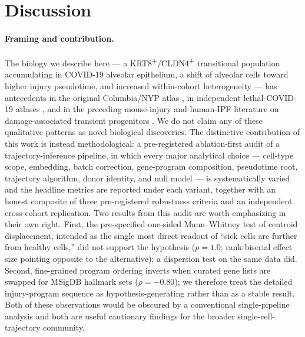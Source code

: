 \documentclass[11pt]{article}
\begin{document}
\section{Discussion}

\paragraph{Framing and contribution.} The biology we describe here --- a KRT8\textsuperscript{+}/CLDN4\textsuperscript{+} transitional population accumulating in COVID-19 alveolar epithelium, a shift of alveolar cells toward higher injury pseudotime, and increased within-cohort heterogeneity --- has antecedents in the original Columbia/NYP atlas \citep{Melms2021}, in independent lethal-COVID-19 atlases \citep{Delorey2021, Bharat2020, Wendisch2021}, and in the preceding mouse-injury and human-IPF literature on damage-associated transient progenitors \citep{Kobayashi2020, Strunz2020, Adams2020, Habermann2020}. We do not claim any of these qualitative patterns as novel biological discoveries. The distinctive contribution of this work is instead methodological: a pre-registered ablation-first audit of a trajectory-inference pipeline, in which every major analytical choice --- cell-type scope, embedding, batch correction, gene-program composition, pseudotime root, trajectory algorithm, donor identity, and null model --- is systematically varied and the headline metrics are reported under each variant, together with an honest composite of three pre-registered robustness criteria and an independent cross-cohort replication. Two results from this audit are worth emphasizing in their own right. First, the pre-specified one-sided Mann--Whitney test of centroid displacement, intended as the single most direct readout of ``sick cells are further from healthy cells,'' did not support the hypothesis ($p = 1.0$; rank-biserial effect size pointing opposite to the alternative); a dispersion test on the same data did. Second, fine-grained program ordering inverts when curated gene lists are swapped for MSigDB hallmark sets ($\rho = -0.80$); we therefore treat the detailed injury-program sequence as hypothesis-generating rather than as a stable result. Both of these observations would be obscured by a conventional single-pipeline analysis and both are useful cautionary findings for the broader single-cell-trajectory community.
\end{document}

